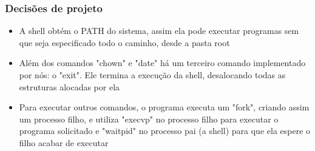 \documentclass{beamer}
\begin{document}
\begin{frame}
\frametitle{Decisões de projeto}
\begin{itemize}
\item A shell obtém o PATH do sistema, assim ela pode executar programas sem que seja especificado todo o caminho, desde a pasta root
\item Além dos comandos "chown" e "date" há um terceiro comando implementado por nós: o "exit". Ele termina a execução da shell, desalocando todas as estruturas alocadas por ela
\item Para executar outros comandos, o programa executa um "fork", criando assim um processo filho, e utiliza "execvp" no processo filho para executar o programa solicitado e "waitpid" no processo pai (a shell) para que ela espere o filho acabar de executar
\end{itemize}
\end{frame}







\end{document}
